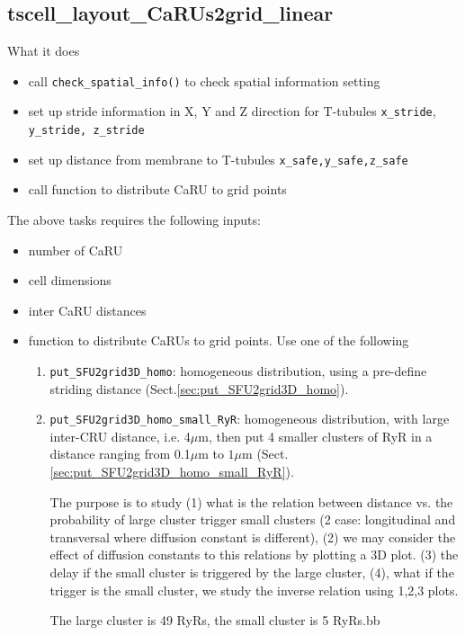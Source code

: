 \subsection{tscell\_layout\_CaRUs2grid\_linear}
\label{sec:spatial_layoyut}

What it does
\begin{itemize}
\item call \verb!check_spatial_info()! to check spatial information
  setting
\item set up stride information in X, Y and Z direction for T-tubules
  \verb!x_stride!, \verb!y_stride, z_stride!
\item set up distance from membrane to T-tubules
  \verb!x_safe,y_safe,z_safe!

\item call function to distribute CaRU to grid points
\end{itemize}

The above tasks requires the following inputs:
\begin{itemize}
\item number of CaRU
\item cell dimensions
\item inter CaRU distances
\item function to distribute CaRUs to grid points. Use one of the following
  \begin{enumerate}
  \item \verb!put_SFU2grid3D_homo!: homogeneous distribution, using a
    pre-define striding distance (Sect.\ref{sec:put_SFU2grid3D_homo}). 
  \item \verb!put_SFU2grid3D_homo_small_RyR!: homogeneous distribution, with
  large inter-CRU distance, i.e. 4$\mu$m, then put 4 smaller clusters of RyR in
  a distance ranging from 0.1$\mu$m to $1\mu$m
  (Sect.\ref{sec:put_SFU2grid3D_homo_small_RyR}).
  
  The purpose is to study (1) what is the
  relation between distance vs. the probability of large cluster trigger small
  clusters (2 case: longitudinal and transversal where diffusion constant is
  different), (2) we may consider the effect of diffusion constants to this
  relations by plotting a 3D plot. (3) the delay if the small cluster is
  triggered by the large cluster, (4), what if the trigger is the small cluster,
  we study the inverse relation using 1,2,3 plots. 
  
  The large cluster is 49 RyRs, the small cluster is 5 RyRs.bb
  \end{enumerate}
\end{itemize}

